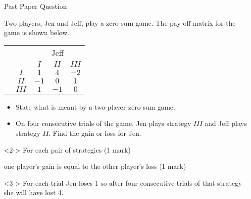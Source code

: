\documentclass[8pt]{beamer}
\begin{document}
\begin{frame}[shrink=5]{Past Paper Question}
	\begin{problem}
		Two players, Jen and Jeff, play a zero-sum game. The pay-off matrix for the game is shown below.	
		\begin{center}
\colorbox{cc}{
	\setlength\arrayrulewidth{0.5mm}
\begin{tabular}{cc|ccc}
	\multicolumn{2}{c}{} & \multicolumn{3}{c}{Jeff}\\
\multicolumn{1}{c}{} &  & $I$  & $II$ & $III$ \\ \hline
\raisebox{0.0cm}{\multirow{3}*{\rotatebox{90}{Jen}}}  & $I$ & $1$ & $4$ & $-2$ \\
& $II$ & $-1$ & $0$ & $1$ \\
& $III$ & $1$ & $-1$ & $0$ \\
\end{tabular}}
\end{center}
\begin{itemize}
	\item State what is meant by a two-player zero-sum game.
	\item On four consecutive trials of the game, Jen plays strategy $III$ and Jeff plays strategy  $II$.
		Find the gain or loss for Jen.
\end{itemize}
	\end{problem}

	\begin{solution}<2->
		For each pair of strategies (1 mark)

		one player’s gain is equal to the other player’s loss (1 mark)
	\end{solution}

	\begin{solution}<3->
		For each trial Jen loses 1 so after four consecutive trials of that strategy she will have lost 4.
	\end{solution}
\end{frame}
\end{document}

